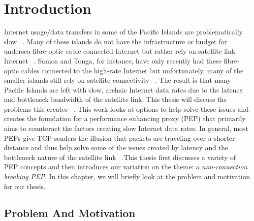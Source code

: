 


\chapter{Introduction}

Internet usage/data transfers in some of the Pacific Islands are problematically slow ~\cite{4}. Many of these islands do not have the infrastructure or budget for undersea fibre-optic cable connected Internet but rather rely on satellite link Internet ~\cite{3}. Samoa and Tonga, for instance, have only recently had these fibre-optic cables connected to the high-rate Internet but unfortunately, many of the smaller islands still rely on satellite connectivity ~\cite{3}. The result is that many Pacific Islands are left with slow, archaic Internet data rates due to the latency and bottleneck bandwidth of the satellite link. This thesis will discuss the problems this creates ~\cite{4}. This work looks at options to help solve these issues and creates the foundation for a performance enhancing proxy (PEP) that primarily aims to counteract the factors creating slow Internet data rates. In general, most PEPs give TCP senders the illusion that packets are traveling over a shorter distance and thus help solve some of the issues created by latency and the bottleneck nature of the satellite link ~\cite{6}.This thesis first discusses a variety of PEP concepts and then introduces our variation on the theme: a \emph{non-connection breaking PEP}. In this chapter, we will briefly look at the problem and motivation for our thesis. 

\section{Problem And Motivation}\label{Motivation}


